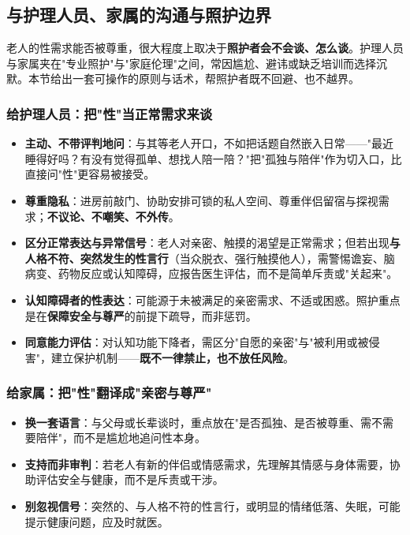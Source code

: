 \subsection{与护理人员、家属的沟通与照护边界}

老人的性需求能否被尊重，很大程度上取决于\textbf{照护者会不会谈、怎么谈}。护理人员与家属夹在"专业照护"与"家庭伦理"之间，常因尴尬、避讳或缺乏培训而选择沉默。本节给出一套可操作的原则与话术，帮照护者既不回避、也不越界。

\subsubsection{给护理人员：把"性"当正常需求来谈}

\begin{itemize}
	\item \textbf{主动、不带评判地问}：与其等老人开口，不如把话题自然嵌入日常——"最近睡得好吗？有没有觉得孤单、想找人陪一陪？"把"孤独与陪伴"作为切入口，比直接问"性"更容易被接受。
	\item \textbf{尊重隐私}：进房前敲门、协助安排可锁的私人空间、尊重伴侣留宿与探视需求；\textbf{不议论、不嘲笑、不外传}。
	\item \textbf{区分正常表达与异常信号}：老人对亲密、触摸的渴望是正常需求；但若出现\textbf{与人格不符、突然发生的性言行}（当众脱衣、强行触摸他人），需警惕谵妄、脑病变、药物反应或认知障碍，应报告医生评估，而不是简单斥责或"关起来"。
	\item \textbf{认知障碍者的性表达}：可能源于未被满足的亲密需求、不适或困惑。照护重点是在\textbf{保障安全与尊严}的前提下疏导，而非惩罚。
	\item \textbf{同意能力评估}：对认知功能下降者，需区分"自愿的亲密"与"被利用或被侵害"，建立保护机制——\textbf{既不一律禁止，也不放任风险}。
\end{itemize}

\subsubsection{给家属：把"性"翻译成"亲密与尊严"}

\begin{itemize}
	\item \textbf{换一套语言}：与父母或长辈谈时，重点放在"是否孤独、是否被尊重、需不需要陪伴"，而不是尴尬地追问性本身。
	\item \textbf{支持而非审判}：若老人有新的伴侣或情感需求，先理解其情感与身体需要，协助评估安全与健康，而不是斥责或干涉。
	\item \textbf{别忽视信号}：突然的、与人格不符的性言行，或明显的情绪低落、失眠，可能提示健康问题，应及时就医。
\end{itemize}

